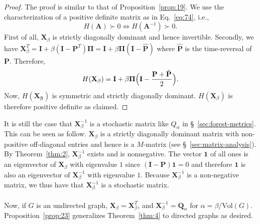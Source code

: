 \begin{proof}
  The proof is similar to that of Proposition~\ref{prop:19}.  We use
  the characterization of a positive definite matrix as in
  Eq.~\eqref{eq:74}, i.e.,
  \begin{equation*}
    H(\mathbf{A}) \succ 0 \Leftrightarrow
    H(\mathbf{A}^{-1}) \succ 0.
  \end{equation*}
  First of all, $\mathbf{X}_{\beta}$ is strictly diagonally dominant
  and hence invertible. Secondly, we have $\mathbf{X}_{\beta}^{T} =
  \mathbf{I} + \beta (\mathbf{I} - \mathbf{P}^{T}) \bm{\Pi} =
  \mathbf{I} + \beta \bm{\Pi} (\mathbf{I} - \hat{\mathbf{P}})$ where
  $\hat{\mathbf{P}}$ is the time-reversal of $\mathbf{P}$. Therefore, 
  \begin{equation}
    \label{eq:82}
    H(\mathbf{X}_{\beta}) = \mathbf{I}
    + \beta \bm{\Pi}\Bigl(\mathbf{I} - \frac{\mathbf{P} + \hat{\mathbf{P}}}{2}
    \Bigr).
  \end{equation}
  Now, $H(\mathbf{X_{\beta}})$ is symmetric and strictly diagonally
  dominant. $H(\mathbf{X}_\beta)$ is therefore positive definite as
  claimed.
\end{proof}
It is still the case that $\mathbf{X}_{\beta}^{-1}$ is a stochastic
matrix like $Q_{\alpha}$ in \S~\ref{sec:forest-metrics}. This can be seen as
follow. $\mathbf{X}_{\beta}$ is a strictly diagonally dominant matrix
with non-positive off-diagonal entries and hence is a $M$-matrix (see
\S~\ref{sec:matrix-analysis}). By
Theorem~\ref{thm:2}, $\mathbf{X}_{\beta}^{-1}$ exists and is
nonnegative. The vector $\bm{1}$ of all ones is an eigenvector of
$\mathbf{X}_{\beta}$ with eigenvalue $1$ since $(\mathbf{I} -
\mathbf{P})\bm{1} = 0$ and therefore $\bm{1}$ is also an eigenvector
of $\mathbf{X}_{\beta}^{-1}$ with eigenvalue $1$. Because 
$\mathbf{X}_{\beta}^{-1}$ is a non-negative matrix, we thus have that
$\mathbf{X}_{\beta}^{-1}$ is a stochastic
matrix. \\ \\
% 
% 
Now, if $G$ is an undirected graph, $\mathbf{X}_{\beta} =
\mathbf{X}_{\beta}^{T}$, and $\mathbf{X}_{\beta}^{-1} =
  \mathbf{Q}_{\alpha}$ for $\alpha =
\beta/\mathrm{Vol}(G)$. Proposition~\ref{prop:23} generalizes
Theorem~\ref{thm:4} to directed graphs as desired.

